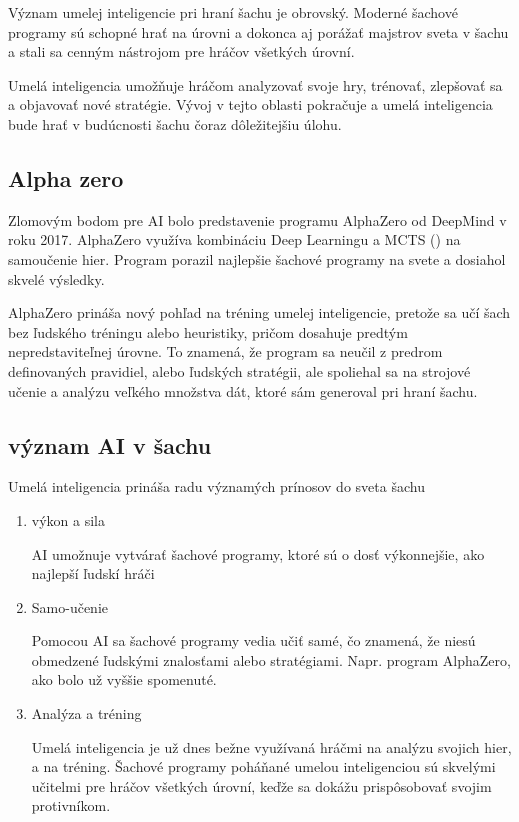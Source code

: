\documentclass[10pt,twoside,slovak,a4paper]{article}
\begin{document}
Význam umelej inteligencie pri hraní šachu je obrovský. Moderné šachové programy sú schopné hrať na úrovni a dokonca aj porážať majstrov sveta v šachu a stali sa cenným nástrojom pre hráčov všetkých úrovní. 

Umelá inteligencia umožňuje hráčom analyzovať svoje hry, trénovať, zlepšovať sa a objavovať nové stratégie. Vývoj v tejto oblasti pokračuje a umelá inteligencia bude hrať v budúcnosti šachu čoraz dôležitejšiu úlohu.
\subsection{Alpha zero} \label{alphaZeroAI}

Zlomovým bodom pre AI bolo predstavenie programu AlphaZero od DeepMind v roku 2017. \cite{AlphaZero} AlphaZero využíva kombináciu Deep Learningu a MCTS () na samoučenie hier. Program porazil najlepšie šachové programy na svete a dosiahol skvelé výsledky.

AlphaZero prináša nový pohľad na tréning umelej inteligencie, pretože sa učí šach bez ľudského tréningu alebo heuristiky, pričom dosahuje predtým nepredstaviteľnej úrovne. To znamená, že program sa neučil z predrom definovaných pravidiel, alebo ľudských stratégii, ale spoliehal sa na strojové učenie a analýzu veľkého množstva dát, ktoré sám generoval pri hraní šachu.

\subsection{význam AI v šachu} \label{RoleAI}
Umelá inteligencia prináša radu významých prínosov do sveta šachu
\begin{enumerate}
	\item výkon a sila

AI umožnuje vytvárať šachové programy, ktoré sú o dosť výkonnejšie, ako najlepší ľudskí hráči
	\item Samo-učenie

Pomocou AI sa šachové programy vedia učiť samé, čo znamená, že niesú obmedzené ľudskými znalosťami alebo stratégiami\cite{NeuralNetwork}. Napr. program AlphaZero, ako bolo už vyššie spomenuté.

	\item Analýza a tréning

Umelá inteligencia je už dnes bežne využívaná hráčmi na analýzu svojich hier, a na tréning. Šachové programy poháňané umelou inteligenciou sú skvelými učitelmi pre hráčov všetkých úrovní, keďže sa dokážu prispôsobovať svojim protivníkom.

\end{enumerate}
\end{document}
